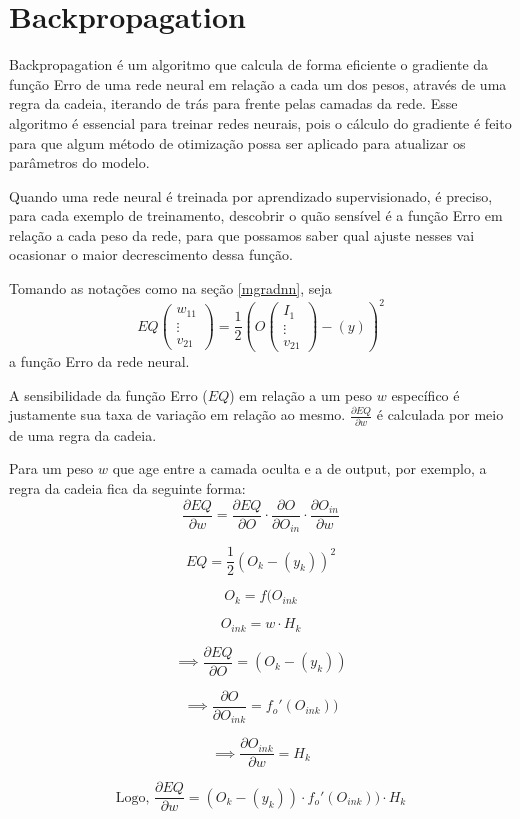 \documentclass{article}
\begin{document}
\section{Backpropagation}

Backpropagation é um algoritmo que calcula de forma eficiente o gradiente da função Erro de uma rede neural em relação a cada um dos pesos, através de uma regra da cadeia, iterando de trás para frente pelas camadas da rede. Esse algoritmo é essencial para treinar redes neurais, pois o cálculo do gradiente é feito para que algum método de otimização possa ser aplicado para atualizar os parâmetros do modelo.

Quando uma rede neural é treinada por aprendizado supervisionado, é preciso, para cada exemplo de treinamento, descobrir o quão sensível é a função Erro em relação a cada peso da rede, para que possamos saber qual ajuste nesses vai ocasionar o maior decrescimento dessa função.

Tomando as notações como na seção \ref{mgradnn}, seja
$$EQ\begin{pmatrix}w_{11}\\\vdots\\v_{21}\end{pmatrix} = \frac{1}{2}(O\begin{pmatrix}I_{1}\\ \vdots \\v_{21} \end{pmatrix} - (y))^2$$
a função Erro da rede neural.

A sensibilidade da função Erro ($EQ$) em relação a um peso $w$ específico é justamente sua taxa de variação em relação ao mesmo. $\frac{\partial EQ}{\partial w}$ é calculada por meio de uma regra da cadeia.

Para um peso $w$ que age entre a camada oculta e a de output, por exemplo, a regra da cadeia fica da seguinte forma:
\\
$$
\frac{\partial EQ}{\partial w} = \frac{\partial EQ}{\partial O}\cdot \frac{\partial O }{\partial O_{in}} \cdot \frac{\partial O_{in}}{\partial w}   
$$

$$ EQ = \frac{1}{2}(O_k - (y_k))^2$$

$$O_k = f(O_{in k}$$

$$O_{in k} = w \cdot H_k$$

$$
\implies \frac{\partial EQ}{\partial O} = (O_k - (y_k))
$$

$$
\implies \frac{\partial O }{\partial O_{in k}} = f_o'(O_{in k}))
$$

$$
\implies \frac{\partial O_{in k}}{\partial w} = H_k
$$

$$
\text{Logo, } \frac{\partial EQ}{\partial w} = (O_k - (y_k)) \cdot f_o'(O_{in k})) \cdot H_k
$$
\end{document}
